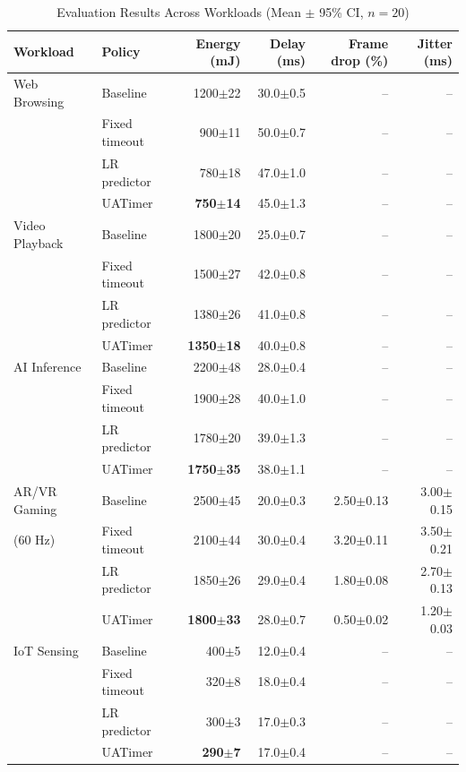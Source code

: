 \documentclass[journal]{IEEEtran}
\begin{document}
\begin{table}[t]
\caption{Evaluation Results Across Workloads (Mean $\pm$ 95\% CI, $n=20$)}
\label{tab:results}
\centering
\begin{tabular}{llrrrr}
\toprule
Workload & Policy & Energy (mJ) & Delay (ms) & Frame drop (\%) & Jitter (ms) \\
\midrule
Web Browsing & Baseline & 1200$\pm$22 & 30.0$\pm$0.5 & -- & -- \\
 & Fixed timeout & 900$\pm$11 & 50.0$\pm$0.7 & -- & -- \\
 & LR predictor & 780$\pm$18 & 47.0$\pm$1.0 & -- & -- \\
 & UATimer & \textbf{750$\pm$14} & 45.0$\pm$1.3 & -- & -- \\
\midrule
Video Playback & Baseline & 1800$\pm$20 & 25.0$\pm$0.7 & -- & -- \\
 & Fixed timeout & 1500$\pm$27 & 42.0$\pm$0.8 & -- & -- \\
 & LR predictor & 1380$\pm$26 & 41.0$\pm$0.8 & -- & -- \\
 & UATimer & \textbf{1350$\pm$18} & 40.0$\pm$0.8 & -- & -- \\
\midrule
AI Inference & Baseline & 2200$\pm$48 & 28.0$\pm$0.4 & -- & -- \\
 & Fixed timeout & 1900$\pm$28 & 40.0$\pm$1.0 & -- & -- \\
 & LR predictor & 1780$\pm$20 & 39.0$\pm$1.3 & -- & -- \\
 & UATimer & \textbf{1750$\pm$35} & 38.0$\pm$1.1 & -- & -- \\
\midrule
AR/VR Gaming & Baseline & 2500$\pm$45 & 20.0$\pm$0.3 & 2.50$\pm$0.13 & 3.00$\pm$0.15 \\
(60 Hz) & Fixed timeout & 2100$\pm$44 & 30.0$\pm$0.4 & 3.20$\pm$0.11 & 3.50$\pm$0.21 \\
 & LR predictor & 1850$\pm$26 & 29.0$\pm$0.4 & 1.80$\pm$0.08 & 2.70$\pm$0.13 \\
 & UATimer & \textbf{1800$\pm$33} & 28.0$\pm$0.7 & 0.50$\pm$0.02 & 1.20$\pm$0.03 \\
\midrule
IoT Sensing & Baseline & 400$\pm$5 & 12.0$\pm$0.4 & -- & -- \\
 & Fixed timeout & 320$\pm$8 & 18.0$\pm$0.4 & -- & -- \\
 & LR predictor & 300$\pm$3 & 17.0$\pm$0.3 & -- & -- \\
 & UATimer & \textbf{290$\pm$7} & 17.0$\pm$0.4 & -- & -- \\
\bottomrule
\end{tabular}
\end{table}
\end{document}
